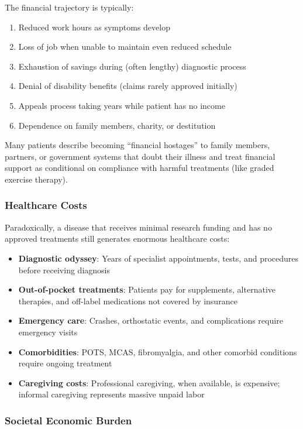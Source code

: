 The financial trajectory is typically:
\begin{enumerate}
    \item Reduced work hours as symptoms develop
    \item Loss of job when unable to maintain even reduced schedule
    \item Exhaustion of savings during (often lengthy) diagnostic process
    \item Denial of disability benefits (claims rarely approved initially)
    \item Appeals process taking years while patient has no income
    \item Dependence on family members, charity, or destitution
\end{enumerate}

Many patients describe becoming ``financial hostages'' to family members, partners, or government systems that doubt their illness and treat financial support as conditional on compliance with harmful treatments (like graded exercise therapy).

\subsubsection{Healthcare Costs}
\label{subsec:healthcare-costs}

Paradoxically, a disease that receives minimal research funding and has no approved treatments still generates enormous healthcare costs:

\begin{itemize}
    \item \textbf{Diagnostic odyssey}: Years of specialist appointments, tests, and procedures before receiving diagnosis
    \item \textbf{Out-of-pocket treatments}: Patients pay for supplements, alternative therapies, and off-label medications not covered by insurance
    \item \textbf{Emergency care}: Crashes, orthostatic events, and complications require emergency visits
    \item \textbf{Comorbidities}: POTS, MCAS, fibromyalgia, and other comorbid conditions require ongoing treatment
    \item \textbf{Caregiving costs}: Professional caregiving, when available, is expensive; informal caregiving represents massive unpaid labor
\end{itemize}

\subsubsection{Societal Economic Burden}
\label{subsec:societal-burden}

